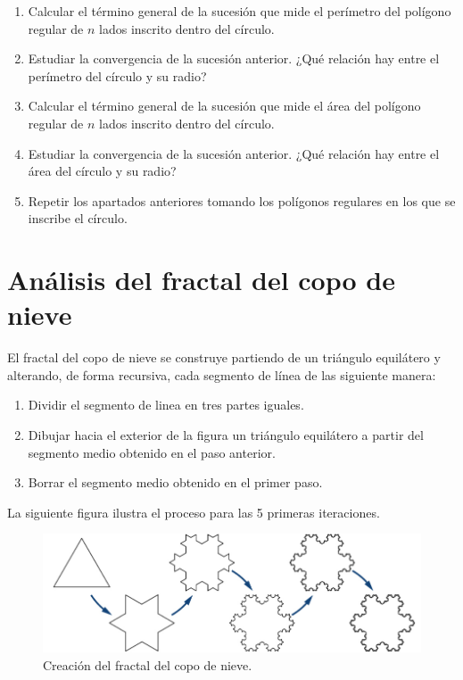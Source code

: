 \documentclass[
  a4paper,
]{scrreport}
\providecommand{\tightlist}{%
  \setlength{\itemsep}{0pt}\setlength{\parskip}{0pt}}\usepackage{longtable,booktabs,array}
\begin{document}
\begin{enumerate}
\def\labelenumi{\arabic{enumi}.}
\item
  Calcular el término general de la sucesión que mide el perímetro del
  polígono regular de \(n\) lados inscrito dentro del círculo.
\item
  Estudiar la convergencia de la sucesión anterior. ¿Qué relación hay
  entre el perímetro del círculo y su radio?
\item
  Calcular el término general de la sucesión que mide el área del
  polígono regular de \(n\) lados inscrito dentro del círculo.
\item
  Estudiar la convergencia de la sucesión anterior. ¿Qué relación hay
  entre el área del círculo y su radio?
\item
  Repetir los apartados anteriores tomando los polígonos regulares en
  los que se inscribe el círculo.
\end{enumerate}


\chapter{Análisis del fractal del copo de
nieve}\label{anuxe1lisis-del-fractal-del-copo-de-nieve}

El fractal del copo de nieve se construye partiendo de un triángulo
equilátero y alterando, de forma recursiva, cada segmento de línea de
las siguiente manera:

\begin{enumerate}
\def\labelenumi{\arabic{enumi}.}
\tightlist
\item
  Dividir el segmento de linea en tres partes iguales.
\item
  Dibujar hacia el exterior de la figura un triángulo equilátero a
  partir del segmento medio obtenido en el paso anterior.
\item
  Borrar el segmento medio obtenido en el primer paso.
\end{enumerate}

La siguiente figura ilustra el proceso para las 5 primeras iteraciones.

\begin{figure}[H]

{\centering \includegraphics{img/series/copo-nieve.png}

}

\caption{Creación del fractal del copo de nieve.}

\end{figure}%
\end{document}

